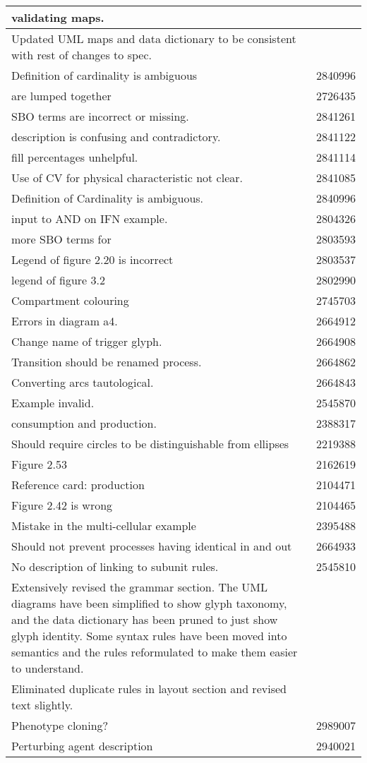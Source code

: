 \begin{center}
\begin{supertabular}{|p{12cm}|c|}
validating maps. & \\\hline
Updated UML maps and data dictionary  to be consistent with rest
of changes to spec. & \\\hline
Definition of cardinality is ambiguous & 2840996 \\\hline
{} are lumped together & 2726435 \\\hline
SBO terms are incorrect or missing. & 2841261 \\\hline
{} description is confusing and contradictory. & 2841122
\\\hline
{} fill percentages unhelpful. & 2841114 \\\hline
Use of CV for physical characteristic not clear. & 2841085 \\\hline
Definition of Cardinality is ambiguous. & 2840996 \\\hline
input to AND on IFN example. & 2804326 \\\hline
more SBO terms for  & 2803593 \\\hline
Legend of figure 2.20 is incorrect & 2803537 \\\hline
legend of figure 3.2 & 2802990 \\\hline
Compartment colouring & 2745703 \\\hline
Errors in diagram a4. & 2664912 \\\hline
Change name of trigger glyph. & 2664908 \\\hline
Transition should be renamed process. & 2664862 \\\hline
Converting arcs tautological. & 2664843 \\\hline
Example invalid. & 2545870 \\\hline
consumption and production. & 2388317 \\\hline
Should require circles to be distinguishable from ellipses & 2219388
\\\hline
Figure 2.53 & 2162619 \\\hline
Reference card: production & 2104471 \\\hline
Figure 2.42 is wrong & 2104465 \\\hline
Mistake in the multi-cellular example  & 2395488 \\\hline
Should not prevent processes having identical in and out & 2664933
\\\hline
No description of linking to subunit rules. & 2545810 \\\hline
Extensively revised the grammar section. The UML diagrams have been simplified to show glyph taxonomy, and the data dictionary has been pruned to just show glyph identity. Some syntax rules have been moved into semantics and the rules reformulated to make them easier to understand. & \\\hline
Eliminated duplicate rules in layout section and revised text
slightly. & \\\hline
Phenotype cloning? & 2989007 \\\hline
Perturbing agent description & 2940021 \\\hline
\end{supertabular}
\end{center}

